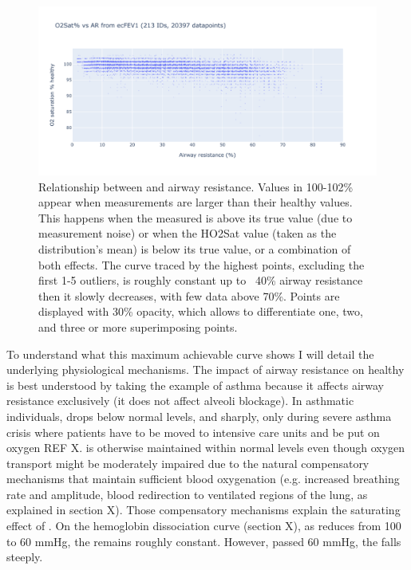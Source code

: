 \begin{figure}[!h]
    \centering
    \includegraphics[width=140mm]{Chapter1/Figs/o2sath_ar.pdf}
    \caption{Relationship between \OXSatPrct and airway resistance. Values in 100-102\% appear when \OXSat measurements are larger than their healthy values. This happens when the measured \OXSat is above its true value (due to measurement noise) or when the HO2Sat value (taken as the distribution's mean) is below its true value, or a combination of both effects. The curve traced by the highest points, excluding the first 1-5 outliers, is roughly constant up to ~40\% airway resistance then it slowly decreases, with few data above 70\%. Points are displayed with 30\% opacity, which allows to differentiate one, two, and three or more superimposing points. }
    \label{fig:o2sath_ar}
\end{figure}


To understand what this maximum achievable \OXSatPrct curve shows I will detail the underlying physiological mechanisms. The impact of airway resistance on healthy \OXSat is best understood by taking the example of asthma because it affects airway resistance exclusively (it does not affect alveoli blockage). In asthmatic individuals, \OXSat drops below normal levels, and sharply, only during severe asthma crisis where patients have to be moved to intensive care units and be put on oxygen REF X. \OXSat is otherwise maintained within normal levels even though oxygen transport might be moderately impaired due to the natural compensatory mechanisms that maintain sufficient blood oxygenation (e.g. increased breathing rate and amplitude, blood redirection to ventilated regions of the lung, as explained in section X). Those compensatory mechanisms explain the saturating effect of \OXSat. On the hemoglobin dissociation curve (section X), as \PA reduces from 100 to 60 mmHg, the \SP remains roughly constant. However, passed 60 mmHg, the \SP falls steeply.

